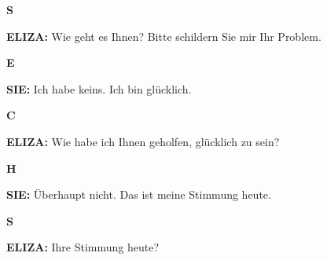 \documentclass{article}
\begin{document}

\begin{minipage}[t]{0.13\textwidth}
  \centering
  {\bfseries\fontsize{14.4}{14.4}\selectfont\textcolor{pastelgreen}{S}}
\end{minipage}%
\begin{minipage}[t]{0.81\textwidth}
  \textbf{ELIZA:} Wie geht es Ihnen? Bitte schildern Sie mir Ihr Problem.
\end{minipage}

\vspace{0.5cm}

\begin{minipage}[t]{0.13\textwidth}
  \centering
  {\bfseries\fontsize{14.4}{14.4}\selectfont\textcolor{pastelgreen}{E}}
\end{minipage}%
\begin{minipage}[t]{0.81\textwidth}
  \textbf{SIE:} Ich habe keins. Ich bin glücklich.
\end{minipage}

\vspace{0.5cm}

\begin{minipage}[t]{0.13\textwidth}
  \centering
  {\bfseries\fontsize{14.4}{14.4}\selectfont\textcolor{pastelgreen}{C}}
\end{minipage}%
\begin{minipage}[t]{0.81\textwidth}
  \textbf{ELIZA:} Wie habe ich Ihnen geholfen, glücklich zu sein?
\end{minipage}

\vspace{0.5cm}

\begin{minipage}[t]{0.13\textwidth}
  \centering
  {\bfseries\fontsize{14.4}{14.4}\selectfont\textcolor{pastelgreen}{H}}
\end{minipage}%
\begin{minipage}[t]{0.81\textwidth}
  \textbf{SIE:} Überhaupt nicht. Das ist meine Stimmung heute.
\end{minipage}

\vspace{0.5cm}

\begin{minipage}[t]{0.13\textwidth}
  \centering
  {\bfseries\fontsize{14.4}{14.4}\selectfont\textcolor{pastelgreen}{S}}
\end{minipage}%
\begin{minipage}[t]{0.81\textwidth}
  \textbf{ELIZA:} Ihre Stimmung heute?
\end{minipage}
\end{document}
